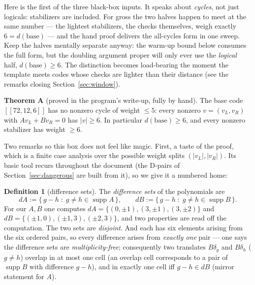 \documentclass[11pt]{article}
\theoremstyle{plain}
\theoremstyle{definition}
\newtheorem{definition}[theorem]{Definition}
\theoremstyle{remark}
\newcommand{\suppop}{\operatorname{supp}}
\newcommand{\base}{\mathrm{base}}
\newcommand{\wt}[1]{\lvert #1\rvert}
\begin{document}
Here is the first of the three black-box inputs. It speaks about
\emph{cycles}, not just logicals: stabilizers are included. For gross the two
halves happen to meet at the same number --- the lightest stabilizers, the
checks themselves, weigh exactly $6 = d(\base)$ --- and the hand proof
delivers the all-cycles form in one sweep. Keep the halves mentally separate
anyway: the warm-up bound below consumes the full form, but the doubling
argument proper will only ever use the \emph{logical} half, $d(\base) \geq
6$. The distinction becomes load-bearing the moment the template meets codes
whose checks are lighter than their distance (see the remarks closing
Section~\ref{sec:window}).

\begin{inputbox}
\textbf{Theorem A} (proved in the program's write-up, fully by hand). The base
code $[[72,12,6]]$ has no nonzero cycle of weight $\leq 5$: every nonzero
$v = (v_L, v_R)$ with $A v_L + B v_R = 0$ has $\wt{v} \geq 6$. In particular
$d(\base) \geq 6$, and every nonzero stabilizer has weight $\geq 6$.
\end{inputbox}

Two remarks so this box does not feel like magic. First, a taste of the proof,
which is a finite case analysis over the possible weight splits
$(\wt{v_L}, \wt{v_R})$. Its basic tool recurs throughout the document (the
D-pairs of Section~\ref{sec:dangerous} are built from it), so we give it a
numbered home:

\begin{definition}[difference sets]\label{def:diffsets}
The \emph{difference sets} of the polynomials are
\[
dA := \{\,g - h \;:\; g \neq h \in \suppop A\,\}, \qquad
dB := \{\,g - h \;:\; g \neq h \in \suppop B\,\}.
\]
For our $A, B$ one computes
$dA = \{(0,{\pm}1), (3,{\pm}1), (3,{\pm}2)\}$ and
$dB = \{({\pm}1,0), ({\pm}1,3), ({\pm}2,3)\}$, and two properties are read
off the computation. The two sets are \emph{disjoint}. And each has six
elements arising from the six ordered pairs, so every difference arises
from \emph{exactly one} pair --- one says the difference sets are
\emph{multiplicity-free}; consequently two translates $B\delta_g$ and
$B\delta_h$ ($g \neq h$) overlap in at most one cell (an overlap cell
corresponds to a pair of $\suppop B$ with difference $g - h$), and in
exactly one cell iff $g - h \in dB$ (mirror statement for $A$).
\end{definition}
\end{document}
